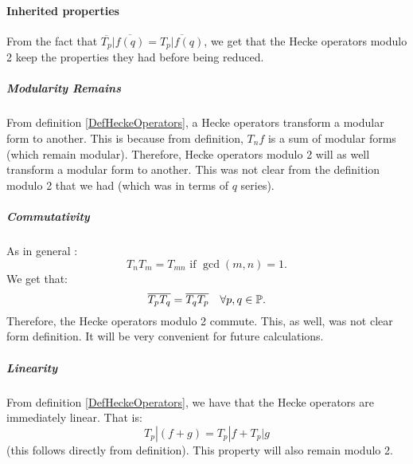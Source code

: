 \paragraph{Inherited properties}
From the fact that $\overline{T_p}|\overline{f(q)} = \overline{T_p|f(q)}$, we get that the Hecke operators modulo 2 keep the properties they had before being reduced.
\subparagraph{Modularity Remains}
\label{HekeModular}
From definition \ref{DefHeckeOperators}, a Hecke operators transform a modular form to another.
This is because from definition, $T_nf$ is a sum of modular forms (which remain modular).
Therefore, Hecke operators modulo 2 will as well transform a modular form to another.
This was not clear from the definition modulo 2 that we had (which was in terms of $q$ series).
\subparagraph{Commutativity}
\label{HekeCommute}
As in general \cite[p.101]{CourseInArithmetic}:
$$
T_nT_m = T_{mn} \text{ if } \gcd(m,n)=1.
$$
We get that:
$$
\overline{T_p}\overline{T_q} = \overline{T_q}\overline{T_p} \quad \forall p,q \in \mathbb{P}.
$$
Therefore, the Hecke operators modulo 2 commute.
This, as well, was not clear form definition.
It will be very convenient for future calculations.
\subparagraph{Linearity}
\label{HekeLinear}
From definition \ref{DefHeckeOperators}, we have that the Hecke operators are immediately linear.
That is:
$$
T_p|(f+g) = T_p|f + T_p|g
$$
(this follows directly from definition).
This property will also remain modulo 2.

